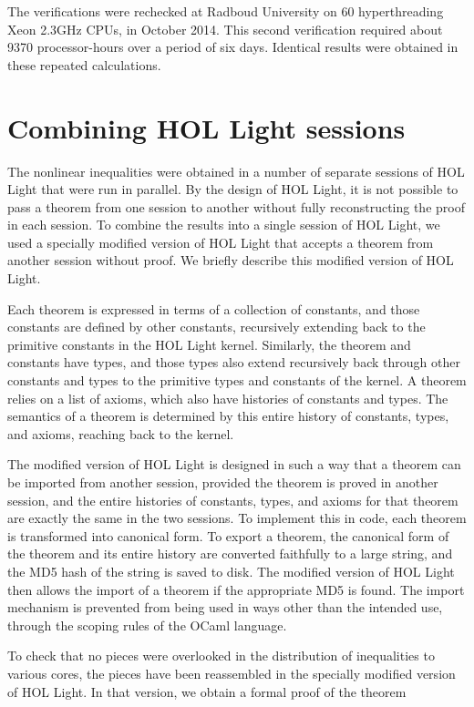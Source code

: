 The verifications were rechecked at Radboud University on 
60 hyperthreading Xeon 2.3GHz CPUs, in October 2014.  This
second verification required about 9370 processor-hours over a period of six
days.  Identical results were obtained in these repeated calculations.

\section{Combining HOL Light sessions}

The nonlinear inequalities were obtained in a number of separate sessions
of HOL Light that were run in parallel.  By the design of HOL Light, it
is not possible to pass a theorem from one session to another without
fully reconstructing the proof in each session.  
To combine the results into a single session of HOL Light, we used a
specially modified version of HOL Light that accepts a theorem from
another session without proof.  We briefly describe this modified
version of HOL Light.

Each theorem is expressed in terms of a collection of constants, and
those constants are defined by other constants, recursively extending
back to the primitive constants in the HOL Light kernel.  Similarly,
the theorem and constants have types, and those types also extend
recursively back through other constants and types to the primitive
types and constants of the kernel.  A theorem relies on a list of
axioms, which also have histories of constants and types.  The
semantics of a theorem is determined by this entire history of
constants, types, and axioms, reaching back to the kernel.

The modified version of HOL Light is designed in such a way that a
theorem can be imported from another session, provided the theorem is
proved in another session, and the entire histories of constants,
types, and axioms for that theorem are exactly the same in the two
sessions.  To implement this in code, each theorem is transformed into
canonical form.  To export a theorem, the canonical form of the
theorem and its entire history are converted faithfully to a large
string, and the MD5 hash of the string is saved to disk.  The modified
version of HOL Light then allows the import of a theorem if the
appropriate MD5 is found.  The import mechanism is prevented from
being used in ways other than the intended use, through the scoping
rules of the OCaml language.

To check that no pieces were overlooked in the distribution of
inequalities to various cores, the pieces have been reassembled in the
specially modified version of HOL Light.  In that version, we obtain
a formal proof of the theorem

